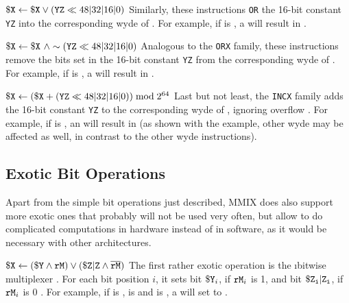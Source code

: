 \instrtbl
	{}
	{${\tt \$X} \leftarrow {\tt \$X} \lor ({\tt YZ} \ll 48|32|16|0)$}
\noindent Similarly, these instructions {\tt OR} the 16-bit constant {\tt YZ} into the corresponding wyde of  \citep[pg. 7]{mmix-doc}. For example, if  is , a  will result in .

\instrtbl
	{}
	{${\tt \$X} \leftarrow {\tt \$X}~\land \sim({\tt YZ} \ll 48|32|16|0)$}
\noindent Analogous to the {\tt ORX} family, these instructions remove the bits set in the 16-bit constant {\tt YZ} from the corresponding wyde of  \citep[pg. 7]{mmix-doc}. For example, if  is , a  will result in .

\instrtbl
	{}
	{${\tt \$X} \leftarrow ({\tt \$X} + ({\tt YZ} \ll 48|32|16|0)) \bmod 2^{64}$}
\noindent Last but not least, the {\tt INCX} family adds the 16-bit constant {\tt YZ} to the corresponding wyde of , ignoring overflow \citep[pg. 7]{mmix-doc}. For example, if  is , an  will result in  (as shown with the example, other wyde may be affected as well, in contrast to the other wyde instructions).

\subsection{Exotic Bit Operations}

Apart from the simple bit operations just described, MMIX does also support more exotic ones that probably will not be used very often, but allow to do complicated computations in hardware instead of in software, as it would be necessary with other architectures.

\instrtbl
	{}
	{${\tt \$X} \leftarrow ({\tt \$Y} \land {\tt rM}) \lor ({\tt \$Z}{\tt|Z} \land \mathbin{\overline{{\tt rM}}})$}
\noindent The first rather exotic operation is the \i{bitwise multiplexer} . For each bit position $i$, it sets bit ${\tt \$Y}_i$, if ${\tt rM}_i$ is 1, and bit ${\tt \$Z_i}{\tt|Z_i}$, if ${\tt rM}_i$ is 0 \citep[pg. 7]{mmix-doc}. For example, if  is ,  is  and  is , a  will set  to .

